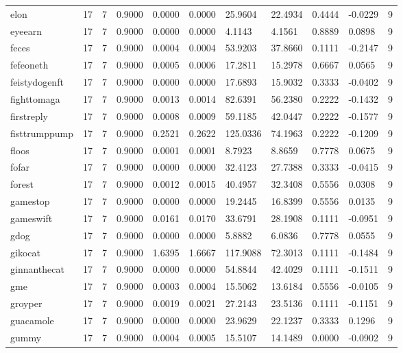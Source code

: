 \begin{table}[htbp]
\begin{tabular}{lllllllllll}
elon & 17 & 7 & 0.9000 & 0.0000 & 0.0000 & 25.9604 & 22.4934 & 0.4444 & -0.0229 & 9 \\
eyeearn & 17 & 7 & 0.9000 & 0.0000 & 0.0000 & 4.1143 & 4.1561 & 0.8889 & 0.0898 & 9 \\
feces & 17 & 7 & 0.9000 & 0.0004 & 0.0004 & 53.9203 & 37.8660 & 0.1111 & -0.2147 & 9 \\
fefeoneth & 17 & 7 & 0.9000 & 0.0005 & 0.0006 & 17.2811 & 15.2978 & 0.6667 & 0.0565 & 9 \\
feistydogenft & 17 & 7 & 0.9000 & 0.0000 & 0.0000 & 17.6893 & 15.9032 & 0.3333 & -0.0402 & 9 \\
fighttomaga & 17 & 7 & 0.9000 & 0.0013 & 0.0014 & 82.6391 & 56.2380 & 0.2222 & -0.1432 & 9 \\
firstreply & 17 & 7 & 0.9000 & 0.0008 & 0.0009 & 59.1185 & 42.0447 & 0.2222 & -0.1577 & 9 \\
fisttrumppump & 17 & 7 & 0.9000 & 0.2521 & 0.2622 & 125.0336 & 74.1963 & 0.2222 & -0.1209 & 9 \\
floos & 17 & 7 & 0.9000 & 0.0001 & 0.0001 & 8.7923 & 8.8659 & 0.7778 & 0.0675 & 9 \\
fofar & 17 & 7 & 0.9000 & 0.0000 & 0.0000 & 32.4123 & 27.7388 & 0.3333 & -0.0415 & 9 \\
forest & 17 & 7 & 0.9000 & 0.0012 & 0.0015 & 40.4957 & 32.3408 & 0.5556 & 0.0308 & 9 \\
gamestop & 17 & 7 & 0.9000 & 0.0000 & 0.0000 & 19.2445 & 16.8399 & 0.5556 & 0.0135 & 9 \\
gameswift & 17 & 7 & 0.9000 & 0.0161 & 0.0170 & 33.6791 & 28.1908 & 0.1111 & -0.0951 & 9 \\
gdog & 17 & 7 & 0.9000 & 0.0000 & 0.0000 & 5.8882 & 6.0836 & 0.7778 & 0.0555 & 9 \\
gikocat & 17 & 7 & 0.9000 & 1.6395 & 1.6667 & 117.9088 & 72.3013 & 0.1111 & -0.1484 & 9 \\
ginnanthecat & 17 & 7 & 0.9000 & 0.0000 & 0.0000 & 54.8844 & 42.4029 & 0.1111 & -0.1511 & 9 \\
gme & 17 & 7 & 0.9000 & 0.0003 & 0.0004 & 15.5062 & 13.6184 & 0.5556 & -0.0105 & 9 \\
groyper & 17 & 7 & 0.9000 & 0.0019 & 0.0021 & 27.2143 & 23.5136 & 0.1111 & -0.1151 & 9 \\
guacamole & 17 & 7 & 0.9000 & 0.0000 & 0.0000 & 23.9629 & 22.1237 & 0.3333 & 0.1296 & 9 \\
gummy & 17 & 7 & 0.9000 & 0.0004 & 0.0005 & 15.5107 & 14.1489 & 0.0000 & -0.0902 & 9 \\

\end{tabular}
\end{table}

